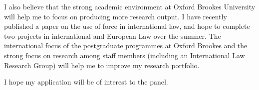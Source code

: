 \documentclass[11pt,a4paper]{moderncv}
\begin{document}
I also believe that the strong academic environment at Oxford Brookes University will help me to focus on producing more research output. I have recently published a paper on the use of force in international law, and hope to complete two projects in international and European Law over the summer. The international focus of the postgraduate programmes at Oxford Brookes and the strong focus on research among staff members (including an International Law Research Group) will help me to improve my research portfolio.

I hope my application will be of interest to the panel.

\makeletterclosing
\end{document}
